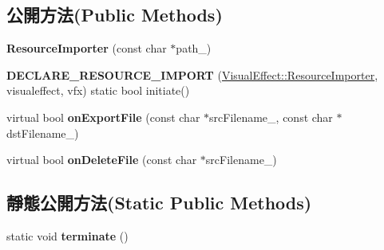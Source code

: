 \subsection*{公開方法(Public Methods)}
\begin{DoxyCompactItemize}
\item 
{\bfseries Resource\+Importer} (const char $\ast$path\+\_\+)\hypertarget{class_magnum_1_1_visual_effect_1_1_resource_importer_acb7cc3f54075d243de9ae3bb0b5e3b6b}{}\label{class_magnum_1_1_visual_effect_1_1_resource_importer_acb7cc3f54075d243de9ae3bb0b5e3b6b}

\item 
{\bfseries D\+E\+C\+L\+A\+R\+E\+\_\+\+R\+E\+S\+O\+U\+R\+C\+E\+\_\+\+I\+M\+P\+O\+RT} (\hyperlink{class_magnum_1_1_visual_effect_1_1_resource_importer}{Visual\+Effect\+::\+Resource\+Importer}, visualeffect, vfx) static bool initiate()\hypertarget{class_magnum_1_1_visual_effect_1_1_resource_importer_a1654a438d4da29b3c44fdc94ed3235dd}{}\label{class_magnum_1_1_visual_effect_1_1_resource_importer_a1654a438d4da29b3c44fdc94ed3235dd}

\item 
virtual bool {\bfseries on\+Export\+File} (const char $\ast$src\+Filename\+\_\+, const char $\ast$dst\+Filename\+\_\+)\hypertarget{class_magnum_1_1_visual_effect_1_1_resource_importer_a0949a0e927a699be760c420624c49dbc}{}\label{class_magnum_1_1_visual_effect_1_1_resource_importer_a0949a0e927a699be760c420624c49dbc}

\item 
virtual bool {\bfseries on\+Delete\+File} (const char $\ast$src\+Filename\+\_\+)\hypertarget{class_magnum_1_1_visual_effect_1_1_resource_importer_ad62e4dfb7c8a68b5627b47a1d8032a5b}{}\label{class_magnum_1_1_visual_effect_1_1_resource_importer_ad62e4dfb7c8a68b5627b47a1d8032a5b}

\end{DoxyCompactItemize}
\subsection*{靜態公開方法(Static Public Methods)}
\begin{DoxyCompactItemize}
\item 
static void {\bfseries terminate} ()\hypertarget{class_magnum_1_1_visual_effect_1_1_resource_importer_a15ea398bb3d478a3f99112391e79969f}{}\label{class_magnum_1_1_visual_effect_1_1_resource_importer_a15ea398bb3d478a3f99112391e79969f}

\end{DoxyCompactItemize}
